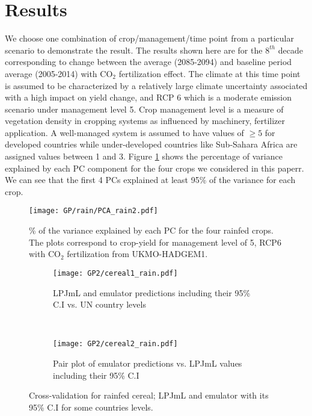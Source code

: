 \section{Results}\label{gpresults}
We choose one combination of crop/management/time point from a particular scenario to demonstrate the result. The results shown here are for the $8^{th}$ decade corresponding to change between the average (2085-2094) and baseline period average (2005-2014) with CO$_2$ fertilization effect. The climate at this time point is assumed to be characterized by a relatively large climate uncertainty associated with a high impact on yield change, and RCP 6 which is a moderate emission scenario under management level 5. Crop management level is a measure of vegetation density in cropping systems as influenced by machinery, fertilizer application. A well-managed system is assumed to have values of $\ge 5 $ for developed countries while under-developed countries like Sub-Sahara Africa are assigned values between 1 and 3.
Figure \ref{pca} shows the percentage of variance explained by each PC component for the four crops we considered in this paperr. We can see that the first 4 PCs explained at least 95\% of the variance for each crop.

\begin{figure}[!ht] 
\texttt{[image: GP/rain/PCA\_rain2.pdf]}
\caption[]{\% of the variance explained by each PC for the four rainfed crops. The plots correspond to crop-yield for management level of 5, RCP6 with CO$_2$ fertilization from UKMO-HADGEM1.}\label{pca}
\end{figure}

\begin{figure}[!ht]
\begin{subfigure}[h]{\textwidth}
\centering
\texttt{[image: GP2/cereal1\_rain.pdf]}
\caption{LPJmL and emulator predictions including their 95\% C.I vs. UN country levels}
\label{myfigg9a1}
\end{subfigure}\\
\begin{subfigure}[h]{\textwidth}
\centering
\texttt{[image: GP2/cereal2\_rain.pdf]}
\caption{Pair plot of emulator predictions vs. LPJmL values including their 95\% C.I}
\label{myfigg9a2}
\end{subfigure}
\caption{Cross-validation for rainfed cereal; LPJmL and emulator with its 95\% C.I for some countries levels.}\label{myfigg9a}
\end{figure}

